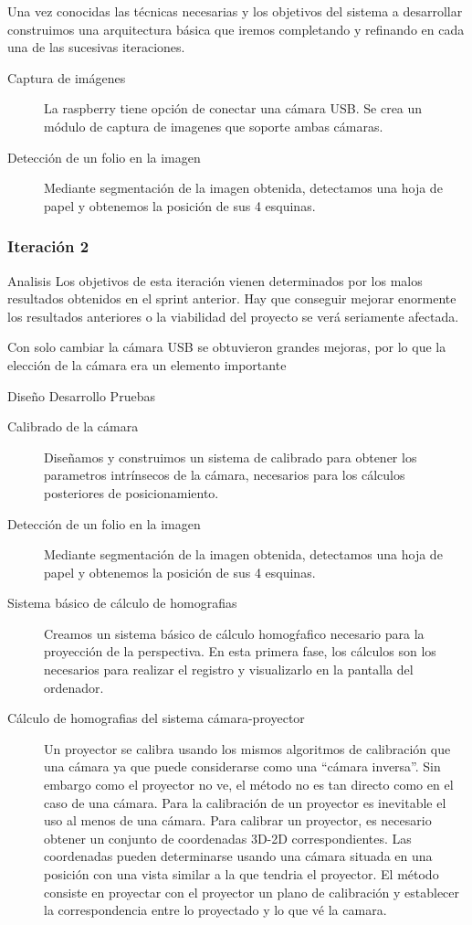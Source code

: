 Una vez conocidas las técnicas necesarias y los objetivos del sistema a desarrollar construimos una arquitectura básica que iremos completando y refinando en cada una de las sucesivas iteraciones.
\begin{description}
\item [Captura de imágenes] La raspberry tiene opción de conectar una cámara USB. Se crea un módulo de captura de imagenes que soporte ambas cámaras.
\item [Detección de un folio en la imagen] Mediante segmentación de la imagen obtenida, detectamos una hoja de papel y obtenemos la posición de sus 4 esquinas.
\end{description}

\subsubsection{Iteración 2}
Analisis
Los objetivos de esta iteración vienen determinados por los malos resultados obtenidos en el sprint anterior. Hay que conseguir mejorar enormente los resultados anteriores o la viabilidad del proyecto se verá seriamente afectada.

Con solo cambiar la cámara USB se obtuvieron grandes mejoras, por lo que la elección de la cámara era un elemento importante


Diseño
Desarrollo
Pruebas







\begin{description}
\item [Calibrado de la cámara] Diseñamos y construimos un sistema de calibrado para obtener los parametros intrínsecos de la cámara, necesarios para los cálculos posteriores de posicionamiento.
\item [Detección de un folio en la imagen] Mediante segmentación de la imagen obtenida, detectamos una hoja de papel y obtenemos la posición de sus 4 esquinas.
\item [Sistema básico de cálculo de homografias] Creamos un sistema básico de cálculo homogŕafico necesario para la proyección de la perspectiva. En esta primera fase, los cálculos son los
  necesarios para realizar el registro y visualizarlo en la pantalla del ordenador.
\item [Cálculo de homografias del sistema cámara-proyector] Un proyector se calibra usando los mismos algoritmos de calibración que una cámara ya que puede considerarse como una ``cámara inversa''. Sin embargo como el proyector no ve, el método no es tan directo como en el caso de una cámara.
Para la calibración de un proyector es inevitable el uso al menos de una cámara. Para calibrar un proyector, es necesario obtener un conjunto de coordenadas 3D-2D correspondientes. Las coordenadas pueden determinarse usando una cámara situada en una posición con una vista similar a la que tendria el proyector. El método consiste en proyectar con el proyector un plano de calibración y establecer la correspondencia entre lo proyectado y lo que vé la camara.

\end{description}

